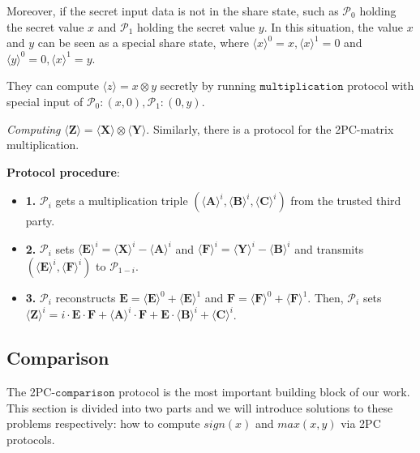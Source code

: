 \documentclass[letterpaper]{article} %
\begin{document}
    Moreover, if the secret input data is not in the share state,
    such as $\mathcal{P}_{0}$ holding the secret value $x$
    and $\mathcal{P}_{1}$ holding the secret value $y$.
    In this situation, the value $x$ and $y$ can be
    seen as a special share state, where
    $\langle x\rangle ^{0}=x,\langle x\rangle ^{1}=0$ and
    $\langle y\rangle ^{0}=0,\langle x\rangle ^{1}=y$.

    They can compute $\langle z\rangle=x\otimes y$ secretly
    by running $\mathtt{multiplication}$ protocol with special input of
    $\mathcal{P}_{0}:(x,0),\mathcal{P}_{1}:(0,y)$.

    \emph{Computing} $ \langle \mathbf{Z}\rangle  = \langle \mathbf{X}\rangle  \otimes \langle \mathbf{Y}\rangle$.
    Similarly, there is a protocol for the 2PC-matrix multiplication.

    \textbf{Protocol procedure}:
    \begin{itemize}
        \item \textbf{1.} $\mathcal{P}_{i}$ gets a multiplication triple
        $(\langle \mathbf{A}\rangle ^{i},\langle \mathbf{B}\rangle ^{i},\langle \mathbf{C}\rangle ^{i})$ from the trusted third party.
        \item \textbf{2.} $\mathcal{P}_{i}$ sets $\langle \mathbf{E}\rangle ^{i}=\langle \mathbf{X}\rangle ^{i}-\langle \mathbf{A}\rangle ^{i}$ and $\langle \mathbf{F}\rangle ^{i}=\langle \mathbf{Y}\rangle ^{i}-\langle \mathbf{B}\rangle ^{i}$
        and transmits $(\langle \mathbf{E}\rangle ^{i},\langle \mathbf{F}\rangle ^{i})$ to $\mathcal{P}_{1-i}$.
        \item \textbf{3.} $\mathcal{P}_{i}$ reconstructs $\mathbf{E} = \langle \mathbf{E}\rangle ^{0}+\langle \mathbf{E}\rangle ^{1}$ and $\mathbf{F} = \langle \mathbf{F}\rangle ^{0}+\langle \mathbf{F}\rangle ^{1}$.
        Then, $\mathcal{P}_{i}$ sets $\langle \mathbf{Z}\rangle^{i}=i\cdot \mathbf{E} \cdot \mathbf{F} + \langle \mathbf{A}\rangle^{i} \cdot \mathbf{F} + \mathbf{E} \cdot \langle \mathbf{B}\rangle^{i} + \langle \mathbf{C}\rangle^{i}$.

    \end{itemize}

    \subsection{Comparison}
    The 2PC-$\mathtt{comparison}$ protocol is the most important building block of our work.
    This section is divided into two parts and we will introduce solutions to these problems respectively:
    how to compute $sign(x)$ and $max(x,y)$ via 2PC protocols.
\end{document}
